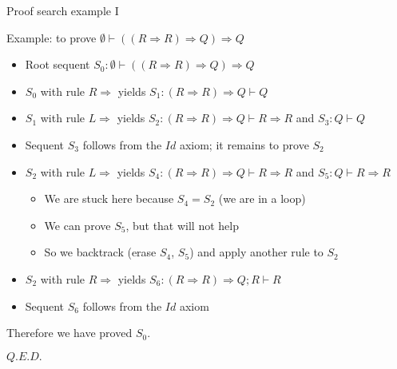 \documentclass[english]{beamer}
\begin{document}
\begin{frame}{Proof search example I}

Example: to prove $\emptyset\vdash\left(\left(R\Rightarrow R\right)\Rightarrow Q\right)\Rightarrow Q$
\begin{itemize}
\item Root sequent $S_{0}:\emptyset\vdash\left(\left(R\Rightarrow R\right)\Rightarrow Q\right)\Rightarrow Q$
\item $S_{0}$ with rule $R\Rightarrow$ yields $S_{1}:\left(R\Rightarrow R\right)\Rightarrow Q\vdash Q$
\item $S_{1}$ with rule $L\Rightarrow$ yields $S_{2}:\left(R\Rightarrow R\right)\Rightarrow Q\vdash R\Rightarrow R$
and $S_{3}:Q\vdash Q$
\item Sequent $S_{3}$ follows from the $Id$ axiom; it remains to prove
$S_{2}$
\item $S_{2}$ with rule $L\Rightarrow$ yields $S_{4}:\left(R\Rightarrow R\right)\Rightarrow Q\vdash R\Rightarrow R$
and $S_{5}:Q\vdash R\Rightarrow R$
\begin{itemize}
\item We are stuck here because $S_{4}=S_{2}$ (we are in a loop)
\item We can prove $S_{5}$, but that will not help
\item So we backtrack (erase $S_{4}$, $S_{5}$) and apply another rule
to $S_{2}$
\end{itemize}
\item $S_{2}$ with rule $R\Rightarrow$ yields $S_{6}:\left(R\Rightarrow R\right)\Rightarrow Q;R\vdash R$
\item Sequent $S_{6}$ follows from the $Id$ axiom
\end{itemize}
Therefore we have proved $S_{0}$.

$Q.E.D.$
\end{frame}
\end{document}
